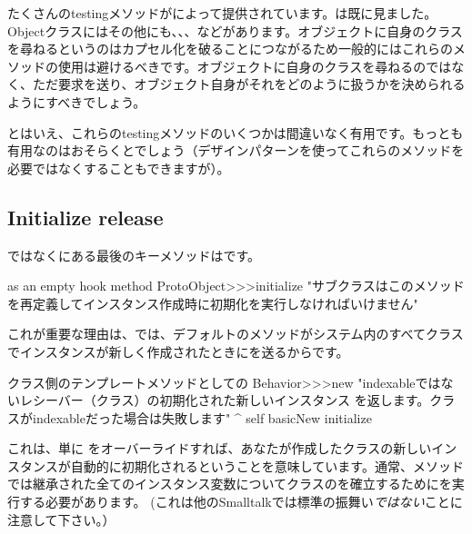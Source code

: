 \documentclass[a4paper,10pt,twoside]{book}
\begin{document}
たくさんのtestingメソッドがによって提供されています。は既に見ました。Objectクラスにはその他にも、、、などがあります。オブジェクトに自身のクラスを尋ねるというのはカプセル化を破ることにつながるため一般的にはこれらのメソッドの使用は避けるべきです。オブジェクトに自身のクラスを尋ねるのではなく、ただ要求を送り、オブジェクト自身がそれをどのように扱うかを決められるようにすべきでしょう。

とはいえ、これらのtestingメソッドのいくつかは間違いなく有用です。もっとも有用なのはおそらくとでしょう（\cite{Wool98a}デザインパターンを使ってこれらのメソッドを必要ではなくすることもできますが）。


\subsection{Initialize release}

ではなくにある最後のキーメソッドはです。

\begin{method}{ as an empty hook method}
ProtoObject>>>initialize
   "サブクラスはこのメソッドを再定義してインスタンス作成時に初期化を実行しなければいけません"
\end{method}

これが重要な理由は、\pharo では、デフォルトのメソッドがシステム内のすべてクラスでインスタンスが新しく作成されたときにを送るからです。

\begin{method}{クラス側のテンプレートメソッドとしての}
Behavior>>>new
    "indexableではないレシーバー（クラス）の初期化された新しいインスタンス
    を返します。クラスがindexableだった場合は失敗します"
    ^ self basicNew initialize
\end{method}

これは、単に をオーバーライドすれば、あなたが作成したクラスの新しいインスタンスが自動的に初期化されるということを意味しています。通常、メソッドでは継承された全てのインスタンス変数についてクラスのを確立するためにを実行する必要があります。
(これは他のSmalltalkでは標準の振舞い\emph{ではない}ことに注意して下さい。）
\end{document}
